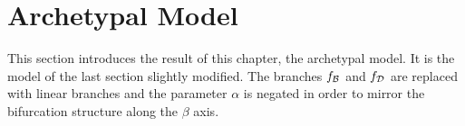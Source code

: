 \section{Archetypal Model}
\label{sec:setup.arch}

This section introduces the result of this chapter, the archetypal model.
It is the model of the last section slightly modified.
The branches $f_{\mathcal{B}}$ and $f_{\mathcal{D}}$ are replaced with linear branches and the parameter $\alpha$ is negated in order to mirror the bifurcation structure along the $\beta$ axis.



